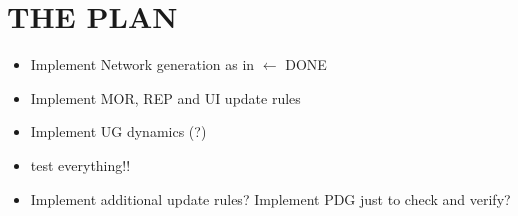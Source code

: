 \section{THE PLAN} %
\begin{itemize}
	\item Implement Network generation as in \cite{Gomez-Gardenes_2006} $\leftarrow$ DONE
	\item Implement MOR, REP and UI update rules
	\item Implement UG dynamics (?) 
	\item test everything!!
	\item Implement additional update rules? Implement PDG just to check and verify?
	\
\end{itemize}



\newpage